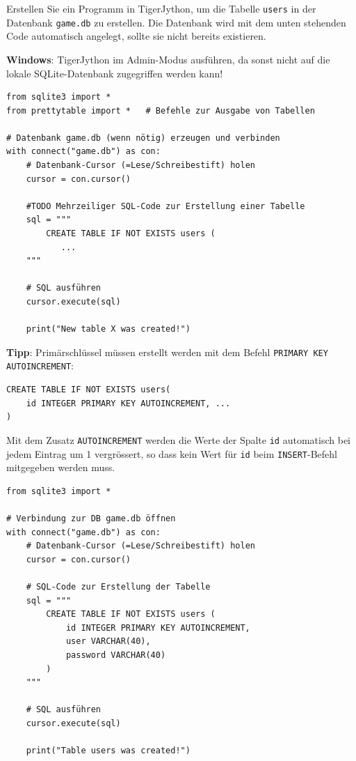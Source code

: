 \begin{myexercise}

Erstellen Sie ein Programm in TigerJython, um die Tabelle \texttt{users} in der Datenbank \texttt{game.db} zu erstellen. Die Datenbank wird mit dem unten stehenden Code automatisch angelegt, sollte sie nicht bereits existieren.
\begin{myattention}
\faWindows{} \textbf{Windows}: TigerJython im Admin-Modus ausführen, da sonst nicht auf die lokale SQLite-Datenbank zugegriffen werden kann!
\end{myattention}

\begin{lstlisting}
from sqlite3 import *
from prettytable import *   # Befehle zur Ausgabe von Tabellen

# Datenbank game.db (wenn nötig) erzeugen und verbinden
with connect("game.db") as con:
    # Datenbank-Cursor (=Lese/Schreibestift) holen
    cursor = con.cursor()
    
    #TODO Mehrzeiliger SQL-Code zur Erstellung einer Tabelle
    sql = """
        CREATE TABLE IF NOT EXISTS users (
           ...
    """
    
    # SQL ausführen
    cursor.execute(sql)

    print("New table X was created!")

\end{lstlisting}

\textbf{Tipp}: Primärschlüssel müssen erstellt werden mit dem Befehl \lstinline[style=sql]|PRIMARY KEY AUTOINCREMENT|:
\begin{lstlisting}[style=sql]
CREATE TABLE IF NOT EXISTS users(
	id INTEGER PRIMARY KEY AUTOINCREMENT, ...
)
\end{lstlisting}
Mit dem Zusatz \lstinline[style=sql]|AUTOINCREMENT| werden die Werte der Spalte \texttt{id} automatisch bei jedem Eintrag um 1 vergrössert, so dass kein Wert für \texttt{id} beim \lstinline[style=sql]|INSERT|-Befehl mitgegeben werden muss.
\begin{myanswer}
\begin{lstlisting}
from sqlite3 import *

# Verbindung zur DB game.db öffnen
with connect("game.db") as con:
    # Datenbank-Cursor (=Lese/Schreibestift) holen
    cursor = con.cursor()
    
    # SQL-Code zur Erstellung der Tabelle
    sql = """
        CREATE TABLE IF NOT EXISTS users (
            id INTEGER PRIMARY KEY AUTOINCREMENT,
            user VARCHAR(40),
            password VARCHAR(40) 
        )
    """
    
    # SQL ausführen
    cursor.execute(sql)

    print("Table users was created!")
\end{lstlisting}
\end{myanswer}
\end{myexercise}



